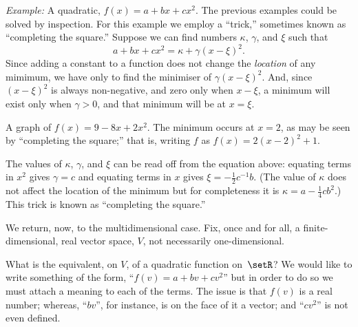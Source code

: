 \documentclass[10pt, a4paper]{article}
\newcommand{\eg}{\emph{Example:}}
\begin{document}
\eg{} A quadratic, $f(x) = a + bx + cx^2$. The previous examples could
be solved by inspection. For this example we employ a “trick,”
sometimes known as “completing the square.” Suppose we can find
numbers $\kappa$, $\gamma$, and $\xi$ such that
\begin{equation}
  a + bx + cx^2 = \kappa + \gamma{(x - \xi)}^2.
\label{eq:completing-the-square}
\end{equation}
Since adding a constant to a function does not change the
\emph{location} of any mimimum, we have only to find the minimiser of
$\gamma{(x-\xi)}^2$. And, since ${(x-\xi)}^2$ is always non-negative, and zero
only when $x-\xi$, a minimum will exist only when $\gamma >0$, and that
minimum will be at $x=\xi$.
\begin{marginfigure}
  \begin{center}
  \end{center}
  \caption{A graph of $f(x) = 9 - 8x + 2x^2$. The minimum occurs at
    $x=2$, as may be seen by “completing the square;” that is, writing
    $f$ as $f(x) = 2{(x-2)}^2+1$.\label{fig:quadratic}}
\end{marginfigure}
The values of $\kappa$, $\gamma$, and $\xi$ can be read off from the equation
above: equating terms in $x^2$ gives $\gamma=c$ and equating terms in
$x$ gives $\xi=-\frac{1}{2}c^{-1}b$. (The value of $\kappa$ does not affect
the location of the minimum but for completeness it is
$\kappa=a-\frac{1}{4}cb^2$.) This trick is known as “completing the
square.”

We return, now, to the multidimensional case. Fix, once and for all, a
finite-dimensional, real vector space, $V$, not necessarily
one-dimensional.

What is the equivalent, on $V$, of a quadratic function on~$\setR$? We
would like to write something of the form, “$f(v) = a+bv+cv^2$” but in
order to do so we must attach a meaning to each of the terms. The
issue is that $f(v)$ is a real number; whereas, “$bv$”, for instance,
is on the face of it a vector; and “$cv^2$” is not even defined.
\end{document}
